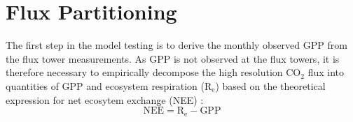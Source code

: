 \section{Flux Partitioning}
\label{sec:fluxparti}
The first step in the model testing is to derive the monthly observed GPP from the flux tower measurements.
As GPP is not observed at the flux towers, it is therefore necessary to empirically decompose the high resolution CO$_{2}$ flux into quantities of GPP and ecosystem respiration (R$_{\mathrm{e}}$) based on the theoretical expression for net ecosytem exchange (NEE) \parencite{lovett06}:
%
\begin{equation}
\label{eq:nee}
    \text{NEE} = \text{R}_{\text{e}} - \text{GPP}
\end{equation}

